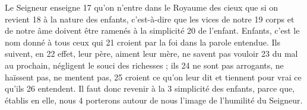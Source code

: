Le Seigneur enseigne	 
17	 	qu'on n'entre dans le Royaume des cieux que si on revient	 
18	 	à la nature des enfants, c'est-à-dire que les vices de notre	 
19	 	corps et de notre âme doivent être ramenés à la simplicité	 
20	 	de l'enfant. Enfants, c'est le nom donné à tous ceux qui	 
21	 	croient par la foi dans la parole entendue. Ils suivent, en	 
22	 	effet, leur père, aiment leur mère, ne savent pas vouloir	 
23	 	du mal au prochain, négligent le souci des richesses ; ils	 
24	 	ne sont pas arrogants, ne haïssent pas, ne mentent pas,	 
25	 	croient ce qu'on leur dit et tiennent pour vrai ce qu'ils	 
26	 	entendent. Il faut donc revenir à la	 
3	 	simplicité des enfants, parce que, établis en elle, nous	 
4	 	porterons autour de nous l'image de l'humilité du Seigneur.
